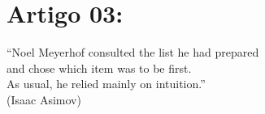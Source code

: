 \chapter{Artigo 03:}



\begin{flushright}
    ``Noel Meyerhof consulted the list he had prepared \\
    and chose which item was to be first. \\
    As usual, he relied mainly on intuition.''\\
    (Isaac Asimov)
    \end{flushright}
\label{cap:paper_03}
